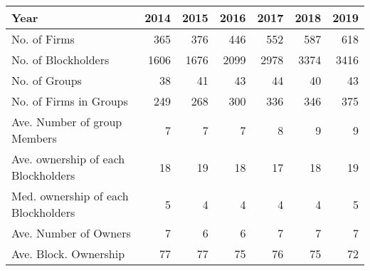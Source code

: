 \begin{tabular}{lrrrrrr}
\toprule
Year &  2014 &  2015 &  2016 &  2017 &  2018 &  2019 \\
\midrule
No. of Firms                        &   365 &   376 &   446 &   552 &   587 &   618 \\
No. of Blockholders                 &  1606 &  1676 &  2099 &  2978 &  3374 &  3416 \\
No. of Groups                       &    38 &    41 &    43 &    44 &    40 &    43 \\
No. of Firms in Groups              &   249 &   268 &   300 &   336 &   346 &   375 \\
Ave. Number of group Members        &     7 &     7 &     7 &     8 &     9 &     9 \\
Ave. ownership of each Blockholders &    18 &    19 &    18 &    17 &    18 &    19 \\
Med. ownership of each Blockholders &     5 &     4 &     4 &     4 &     4 &     5 \\
Ave. Number of Owners               &     7 &     6 &     6 &     7 &     7 &     7 \\
Ave. Block. Ownership               &    77 &    77 &    75 &    76 &    75 &    72 \\
\bottomrule
\end{tabular}
